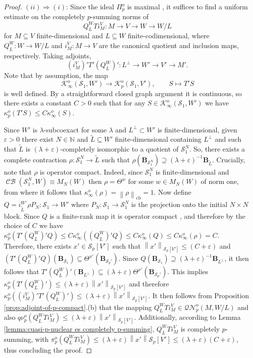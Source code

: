 \documentclass[11pt]{amsart}
\DeclareMathOperator{\cb}{cb}
\DeclareMathOperator{\CB}{\mathcal{CB}}
\newcommand{\n}[1]{ \left\|#1\right\| }
\newcommand{\N}{{\mathbb{N}}}
\numberwithin{equation}{section}
\begin{document}
\begin{proof}
$(ii) \Rightarrow (i)$:
Since the ideal $\Pi_p^o$ is maximal \cite[Ex. 8.3.(iii)]{ChaDiGa-tensor-norms}, it suffices to find a uniform estimate on the completely $p$-summing norms of
\[
Q^W_L  T  i^V_M : M \to V \to W \to W/L
\]
for $M \subseteq V$ finite-dimensional and $L \subseteq W$ finite-codimensional,
where $Q^W_L : W \to W/L$ and $i^V_M : M \to V$ are the canonical quotient and inclusion maps, respectively.
Taking adjoints,
\[
(i^V_M)'  T'  (Q^W_L)' : L^\perp \to W' \to V' \to M'.
\]
Note that by assumption, the map
\[
\mathcal{K}_\infty^o(\mathcal{S}_1, W') \to  \mathcal{K}_p^o(\mathcal{S}_1, V'), \qquad S \mapsto T'S 
\]
is well defined.
By a straightforward closed graph argument it is continuous,
so there exists a constant $C>0$ such that for any $S \in \mathcal{K}_\infty^o(\mathcal{S}_1, W')$ we have $\kappa_p^o(T'S)\le C \kappa_\infty^o(S)$.
 
Since $W'$ is $\lambda$-subcoexact for some $\lambda$ and $L^\perp \subset W'$ is finite-dimensional, given $\varepsilon>0$ there exist $N\in\N$ and $\widetilde{L} \subseteq W'$ finite-dimensional containing $L^\perp$ and such that $\widetilde{L}$ is $(\lambda+\varepsilon)$-completely isomorphic to a quotient of $\mathcal{S}_1^N$. So, there exists a complete contraction $\rho : \mathcal{S}_1^N \to \widetilde{L}$ such that 
$\rho(\mathbf{B}_{\mathcal{S}^N_1}) \supseteq (\lambda+\varepsilon)^{-1} \mathbf{B}_{\widetilde{L}}$.
Crucially, note that $\rho$ is operator compact.
Indeed, since $\mathcal{S}_1^N$ is finite-dimensional and $\CB(\mathcal{S}_1^N,W) \equiv M_N(W)$ 
then $\rho = \Theta^w$ for some $w \in M_N(W)$ of norm one, from where it follows that $\kappa_\infty^o(\rho) = \n{\rho}_{\cb} = 1$.
Now define $Q = i^{W'}_{\widetilde{L}}\rho P_N : \mathcal{S}_1 \to W'$ where $P_N : \mathcal{S}_1 \to \mathcal{S}_1^N$ is the projection onto the initial $N\times N$ block.
Since $Q$ is a finite-rank map it is operator compact 
, and therefore by the choice of $C$ we have $\kappa_p^o(T'(Q^W_L)'Q) \le C \kappa_\infty^o((Q^W_L)'Q) \le  C \kappa_\infty^o(Q) \le C  \kappa_\infty^o(\rho) =C $.
Therefore, there exists $x'\in \mathcal{S}_p[V']$ such that $\n{x'}_{\mathcal{S}_p[V']} \le (C+\varepsilon)$ and $(T'(Q^W_L)'Q)(\mathbf{B}_{\mathcal{S}_1}) \subseteq \Theta^{x'}(\mathbf{B}_{\mathcal{S}_p'})$.
Since $Q(\mathbf{B}_{\mathcal{S}_1}) \supseteq (\lambda+\varepsilon)^{-1} \mathbf{B}_{L^\perp}$,
it then follows that $T'(Q^W_L)'(\mathbf{B}_{L^\perp}) \subseteq (\lambda+\varepsilon)\Theta^{x'}(\mathbf{B}_{\mathcal{S}_p'})$.
This implies
$\kappa_p^o( T'(Q^W_L)') \le (\lambda+\varepsilon)\n{x'}_{\mathcal{S}_p[V']}$ and therefore
$\kappa_p^o( (i^V_M)'T'(Q^W_L)') \le (\lambda+\varepsilon)\n{x'}_{\mathcal{S}_p[V']}$.
It then follows from Proposition \ref{prop:adjoint-of-p-compact}.(b)
that the mapping $Q^W_L T  i^V_M \in \mathcal{QN}^o_p(M,W/L)$ and also $q\nu_p^o( Q^W_L T  i^V_M ) \le (\lambda+\varepsilon)\n{x'}_{\mathcal{S}_p[V']}$.
Additionally, according to Lemma \ref{lemma:cuasi-p-nuclear es completely p-summing}, $Q^W_L T i^V_M$ is completely $p$-summing, with $\pi_p^o(Q^W_L T i^V_M) \le (\lambda+\varepsilon)\n{x'}{\mathcal{S}_p[V']} \le (\lambda+\varepsilon)(C+\varepsilon)$, thus concluding the proof.

\end{proof}
\end{document}
